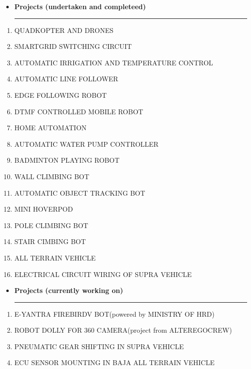 \documentclass[a4paper]{article}
\begin{document}
\renewcommand{\labelitemi}{\texttt{[image: jnj.JPG]}}
\begin{itemize}
  \vspace{4ex}
  \item \textbf{\huge{P}}\textbf{\large rojects (undertaken and completeed)}
  {\color{mypink1}
  \rule{\linewidth}{0.5mm}}
 \end{itemize}
 \begin{enumerate}
     
 \item QUADKOPTER AND DRONES  \item SMARTGRID SWITCHING CIRCUIT  \item AUTOMATIC IRRIGATION AND TEMPERATURE CONTROL  \item AUTOMATIC LINE FOLLOWER  \item EDGE FOLLOWING ROBOT  \item DTMF CONTROLLED MOBILE ROBOT  \item HOME AUTOMATION  \item AUTOMATIC WATER PUMP CONTROLLER  \item BADMINTON PLAYING ROBOT  \item WALL CLIMBING BOT  \item AUTOMATIC OBJECT TRACKING BOT  \item MINI HOVERPOD  \item POLE CLIMBING BOT  \item STAIR CIMBING BOT  \item ALL TERRAIN VEHICLE  \item ELECTRICAL CIRCUIT WIRING OF SUPRA VEHICLE  
 \end{enumerate}

\renewcommand{\labelitemi}{\texttt{[image: jnj.JPG]}}
\begin{itemize}
  \vspace{4ex}
  \item \textbf{\huge{P}}\textbf{\large rojects (currently working on)}
  {\color{mypink1}
  \rule{\linewidth}{0.5mm}}
 \end{itemize}
 \begin{enumerate}
     
 \item E-YANTRA FIREBIRDV BOT(powered by MINISTRY OF HRD) \item ROBOT DOLLY FOR 360 CAMERA(project from ALTEREGOCREW) \item PNEUMATIC GEAR SHIFTING IN SUPRA VEHICLE  \item ECU SENSOR MOUNTING IN BAJA ALL TERRAIN VEHICLE 
 \end{enumerate}
 
\end{document}
